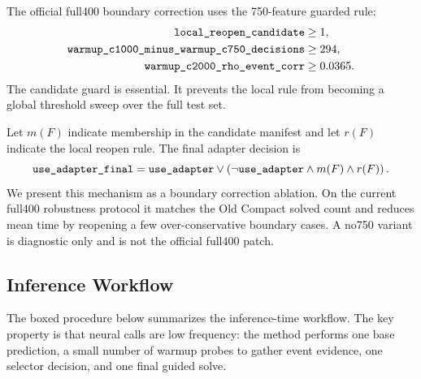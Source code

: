\documentclass[11pt]{article}
\begin{document}
The official full400 boundary correction uses the 750-feature guarded rule:
\begin{align*}
\text{\ttfamily local\_reopen\_candidate} &\ge 1,\\
\text{\ttfamily warmup\_c1000\_minus\_warmup\_c750\_decisions} &\ge 294,\\
\text{\ttfamily warmup\_c2000\_rho\_event\_corr} &\ge 0.0365.
\end{align*}
The candidate guard is essential. It prevents the local rule from becoming a global threshold sweep over the full test set.

Let $m(F)$ indicate membership in the candidate manifest and let $r(F)$ indicate the local reopen rule. The final adapter decision is
\[
\text{\ttfamily use\_adapter\_final}
= \text{\ttfamily use\_adapter}
  \vee
  \left(\neg \text{\ttfamily use\_adapter} \wedge m(F) \wedge r(F)\right).
\]
We present this mechanism as a boundary correction ablation. On the current full400 robustness protocol it matches the Old Compact solved count and reduces mean time by reopening a few over-conservative boundary cases. A no750 variant is diagnostic only and is not the official full400 patch.

\subsection{Inference Workflow}

The boxed procedure below summarizes the inference-time workflow. The key property is that neural calls are low frequency: the method performs one base prediction, a small number of warmup probes to gather event evidence, one selector decision, and one final guided solve.

\begin{center}
\end{center}
\end{document}
